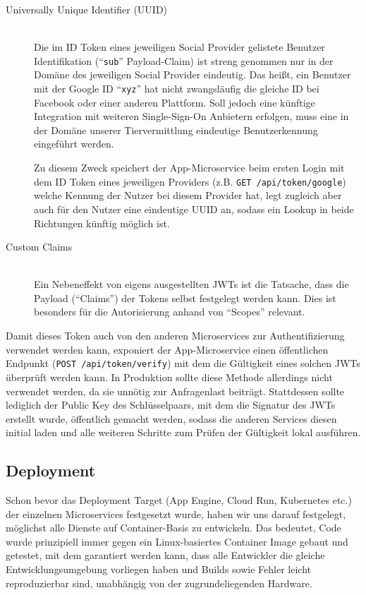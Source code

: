 \documentclass{article}
\begin{document}
\begin{description}
	\item[Universally Unique Identifier (UUID)]
	\hfill \\
	Die im ID Token eines jeweiligen Social Provider gelistete Benutzer Identifikation (\enquote{\texttt{sub}} Payload-Claim) ist streng genommen nur in der Domäne des jeweiligen Social Provider eindeutig. Das heißt, ein Benutzer mit der Google ID \enquote{\texttt{xyz}} hat nicht zwangsläufig die gleiche ID bei Facebook oder einer anderen Plattform. Soll jedoch eine künftige Integration mit weiteren Single-Sign-On Anbietern erfolgen, muss eine in der Domäne unserer Tiervermittlung eindeutige Benutzerkennung eingeführt werden.
	
	Zu diesem Zweck speichert der App-Microservice beim ersten Login mit dem ID Token eines jeweiligen Providers (z.B. \texttt{GET /api/token/google}) welche Kennung der Nutzer bei diesem Provider hat, legt zugleich aber auch für den Nutzer eine eindeutige UUID an, sodass ein Lookup in beide Richtungen künftig möglich ist. 
	
	\item[Custom Claims]
	\hfill \\
	Ein Nebeneffekt von eigens ausgestellten JWTs ist die Tatsache, dass die Payload (\enquote{Claims}) der Tokens selbst festgelegt werden kann. Dies ist besonders für die Autorisierung anhand von \enquote{Scopes} relevant.
\end{description}

Damit dieses Token auch von den anderen Microservices zur Authentifizierung verwendet werden kann, exponiert der App-Microservice einen öffentlichen Endpunkt (\texttt{POST /api/token/verify}) mit dem die Gültigkeit eines solchen JWTs überprüft werden kann. In Produktion sollte diese Methode allerdings nicht verwendet werden, da sie unnötig zur Anfragenlast beiträgt. Stattdessen sollte lediglich der Public Key des Schlüsselpaars, mit dem die Signatur des JWTs erstellt wurde, öffentlich gemacht werden, sodass die anderen Services diesen initial laden und alle weiteren Schritte zum Prüfen der Gültigkeit lokal ausführen. 


\subsection{Deployment}
\label{sec:app-deployment}

Schon bevor das Deployment Target (App Engine, Cloud Run, Kubernetes etc.) der einzelnen Microservices festgesetzt wurde, haben wir uns darauf festgelegt, möglichst alle Dienste auf Container-Basis zu entwickeln. Das bedeutet, Code wurde prinzipiell immer gegen ein Linux-basiertes Container Image gebaut und getestet, mit dem garantiert werden kann, dass alle Entwickler die gleiche Entwicklungsumgebung vorliegen haben und Builds sowie Fehler leicht reproduzierbar sind, unabhängig von der zugrundeliegenden Hardware. 
\end{document}
